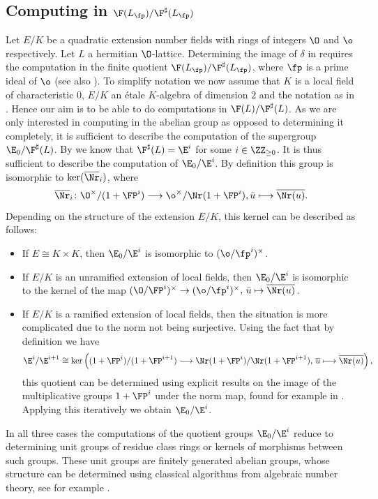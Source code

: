 \subsection{Computing in $\F(L_\fp)/\F^\sharp(L_\fp)$}
Let $E/K$ be a quadratic extension number fields with rings of integers $\O$ and $\o$ respectively. Let $L$ a hermitian $\O$-lattice.
Determining the image of $\delta$ in  requires the computation in the finite quotient $\F(L_\fp)/\F^\sharp(L_\fp)$, where $\fp$ is a prime ideal of $\o$ (see also ).
To simplify notation we now assume that $K$ is a local field of characteristic $0$, $E/K$ an étale $K$-algebra of dimension $2$ and the notation as in .
Hence our aim is to be able to do computations in $\F(L)/\F^\sharp(L)$.
As we are only interested in computing in the abelian group as opposed to determining it completely, it is sufficient to describe the computation of the supergroup $\E_{0}/\F^\sharp(L)$.
By  we know that $\F^\sharp(L) = \E^i$ for some $i \in \ZZ_{\geq 0}$.
It is thus sufficient to describe the computation of $\E_{0}/\E^i$.
By definition this group is isomorphic to $\ker(\overline \Nr_i)$, where
\[ \overline \Nr_i \colon \O^\times{/}(1 + \FP^i) \longrightarrow \o^\times{/}\Nr(1 + \FP^i), \bar u \longmapsto \overline{\Nr(u)}. \]
Depending on the structure of the extension $E/K$, this kernel can be described as follows:
\begin{itemize}
  \item
    If $E \cong K \times K$, then $\E_0/\E^i$ is isomorphic to $(\o/\fp^i)^\times$. 
  \item
  If $E/K$ is an unramified extension of local fields, then $\E_0/\E^i$ is isomorphic to 
  the kernel of the map $(\O/\FP^i)^\times \rightarrow (\o/\fp^i)^\times, \, \bar u \mapsto \overline{\Nr(u)}$. 
\item
  If $E/K$ is a ramified extension of local fields, then the situation is more complicated due to the norm not being surjective.
  Using the fact that by definition we have 
\[ \E^i/\E^{i+1} \cong \ker \left((1 + \FP^i)/(1 + \FP^{i + 1}) \longrightarrow \Nr(1 + \FP^i)/\Nr(1 + \FP^{i+1}),\,  \overline{u} \longmapsto \overline{\Nr(u)}\right), \] 
  this quotient can be determined using explicit results on the image of the multiplicative groups $1 + \FP^i$ under the norm map, found for example in
    \cite[Chap. V]{Serre1979}.
    Applying this iteratively we obtain $\E_0/\E^i$.
\end{itemize}
    In all three cases the computations of the quotient groups $\E_0/\E^i$ reduce to determining unit groups of residue class rings or kernels of morphisms between such groups. These unit groups are finitely generated abelian groups, whose structure can be determined using classical algorithms from algebraic number theory, see for example \cite[Sec. 4.2]{Cohen2000}.


